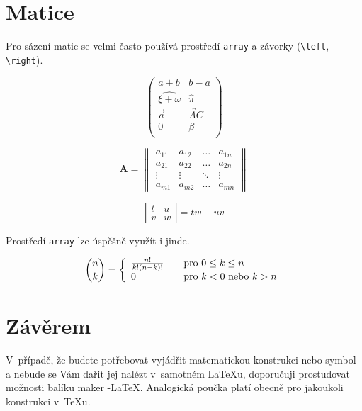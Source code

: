 \documentclass[a4paper,11pt,twocolumn]{article}[2014-03-27]
\begin{document}
\section{Matice}
Pro sázení matic se velmi často používá prostředí \texttt{array} a závorky  (\verb|\left|, \verb|\right|).

 $$\left( \begin{array}{cc}
a + b & b - a \\
\widehat{\xi + \omega} & \hat{\pi} \\
\vec{a} & \overleftrightarrow{AC} \\
0 & \beta\\
\end{array} \right)$$

$$\mathbf{A}=\left\|\begin{array}{cccc}
a_{11} & a_{12} & \ldots & a_{1n} \\
a_{21} & a_{22} & \ldots & a_{2n} \\
\vdots & \vdots & \ddots & \vdots \\
a_{m1} & a_{m2} & \ldots & a_{mn}
\end{array}\right\|$$

$$\left|\begin{array}{cc}
t & u \\ v & w
\end{array}\right| = tw -uv$$

Prostředí \texttt{array} lze úspěšně využít i jinde.

$$\binom{n}{k} = \left\{
\begin{array}{l l}
  \frac{n!}{k!(n-k)!} &\quad \mbox{pro $0 \leq k \leq n$}\\
  0 &\quad \mbox{pro $k < 0$ nebo $k > n$}\\
\end{array} \right. $$


\section{Závěrem}
V~případě, že budete potřebovat vyjádřit matema\-tickou konstrukci nebo symbol a nebude se Vám dařit jej nalézt v~samotném \LaTeX u, doporučuji prostudovat možnosti balíku maker \AmS-\LaTeX.
Analogická poučka platí obecně pro jakoukoli konstruk\-ci v~\TeX u.
\end{document}
